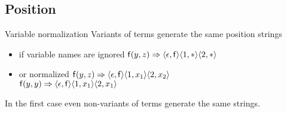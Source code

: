 












\subsection{Position}

\begin{example}{Variable normalization}
	Variants of terms generate the same position strings
	\begin{itemize}
		\item if variable names are ignored
		\hfill \( \mathsf{f}(y,z) \Rightarrow
		\langle\epsilon,\mathsf{f}\rangle
		\langle1,*\rangle
		\langle2,*\rangle
		 \)

		\item or normalized
		\hfill \( \mathsf{f}(y,z) \Rightarrow
		\langle\epsilon,\mathsf{f}\rangle
		\langle1,x_1\rangle
		\langle2,x_2\rangle \)
		\\
		\hfill \( \mathsf{f}(y,y) \Rightarrow
		\langle\epsilon,\mathsf{f}\rangle
		\langle1,x_1\rangle
		\langle2,x_1\rangle
		 \)
	\end{itemize}

	In the first case even non-variants of terms generate the same strings.
\end{example}


